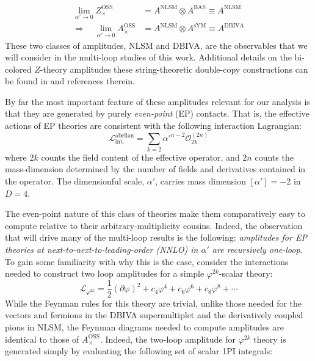 \documentclass[12pt,letter]{article}
\begin{document}
\begin{equation}
\boxed
{\begin{aligned} 
\lim_{\alpha' \to 0 }Z^{\text{OSS}}_{\times}&= A^{\text{NLSM}} \otimes A^{\text{BAS}}\equiv A^{\text{NLSM}}
\\
\Rightarrow \quad\lim_{\alpha' \to 0 }A^{\text{OSS}}_{\times}&= A^{\text{NLSM}} \otimes A^{ \text{sYM}}\equiv A^{\text{DBIVA}}
\end{aligned}}
\end{equation}
These two classes of amplitudes, NLSM and DBIVA, are the observables that we will consider in the multi-loop studies of this work. Additional details on the bi-colored $Z$-theory amplitudes these string-theoretic double-copy constructions can be found in \cite{Broedel:2013tta,Carrasco:2016ldy,Carrasco:2016ygv,Mafra:2016mcc,Azevedo:2018dgo} and references therein.  

By far the most important feature of these amplitudes relevant for our analysis is that they are generated by purely \textit{even-point} (EP) contacts. That is, the effective actions of EP theories are consistent with the following interaction Lagrangian:
\begin{equation}
\mathcal{L}^{\text{abelian}}_{\text{int.}} = \sum_{k=2} \alpha'^{n-2} \mathcal{O}^{(2n)}_{2k} 
\end{equation}
where $2k$ counts the field content of the effective operator, and $2n$ counts the mass-dimension determined by the number of fields and derivatives contained in the operator. The dimensionful scale, $\alpha'$, carries mass dimension $[\alpha']=-2$ in $D=4$. 

The even-point nature of this class of theories make them comparatively easy to compute relative to their arbitrary-multiplicity cousins. Indeed, the observation that will drive many of the multi-loop results is the following: \textit{amplitudes for EP theories at next-to-next-to-leading-order (NNLO) in $\alpha'$ are recursively one-loop}. To gain some familiarity with why this is the case, consider the interactions needed to construct two loop amplitudes for a simple $\varphi^{2k}$-scalar theory:
\begin{equation}\label{eq:evenPointL}
\mathcal{L}_{\varphi^{2k}} = \frac{1}{2}(\partial \varphi)^2 + c_4 \varphi^4 + c_6 \varphi^6+ c_8 \varphi^8+\cdots 
\end{equation}
While the Feynman rules for this theory are trivial, unlike those needed for the vectors and fermions in the DBIVA supermultiplet and the derivatively coupled pions in NLSM, the Feynman diagrams needed to compute amplitudes are identical to those of $A^{\text{OSS}}_{\times}$. Indeed, the two-loop amplitude for $\varphi^{2k}$ theory is generated simply by evaluating the following set of scalar 1PI integrals:
\end{document}
